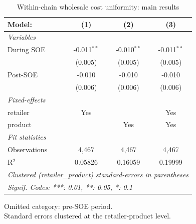 
\begin{table}[htbp]
   \caption{\label{tab:uniformity_wholesale_main} Within-chain wholesale cost uniformity: main results}
   \centering
   \begin{tabular}{lccc}
      \tabularnewline \midrule \midrule
      Model:       & (1)           & (2)           & (3)\\  
      \midrule
      \emph{Variables}\\
      During SOE   & -0.011$^{**}$ & -0.010$^{**}$ & -0.011$^{**}$\\   
                   & (0.005)       & (0.005)       & (0.005)\\   
      Post-SOE     & -0.010        & -0.010        & -0.010\\   
                   & (0.006)       & (0.006)       & (0.006)\\   
      \midrule
      \emph{Fixed-effects}\\
      retailer     & Yes           &               & Yes\\  
      product      &               & Yes           & Yes\\  
      \midrule
      \emph{Fit statistics}\\
      Observations & 4,467         & 4,467         & 4,467\\  
      R$^2$        & 0.05826       & 0.16059       & 0.19999\\  
      \midrule \midrule
      \multicolumn{4}{l}{\emph{Clustered (retailer\_product) standard-errors in parentheses}}\\
      \multicolumn{4}{l}{\emph{Signif. Codes: ***: 0.01, **: 0.05, *: 0.1}}\\
   \end{tabular}
   
   \par \raggedright 
   Omitted category: pre-SOE period.\\
   Standard errors clustered at the retailer-product level.
\end{table}


